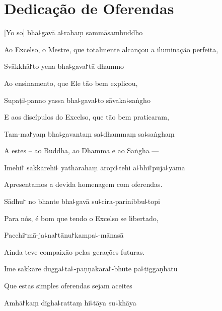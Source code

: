 \chapter{Dedicação de Oferendas}

[Yo so] bha꜕gavā a꜕rahaṃ sammāsambuddho

\begin{english}
Ao Excelso, o Mestre, que totalmente alcançou a iluminação perfeita, 
\end{english}

Svākkhā꜓to yena bha꜕gava꜓tā dhammo

\begin{english}
Ao ensinamento, que Ele tão bem explicou,
\end{english}

Supaṭi꜕panno yassa bha꜕gava꜕to sāvaka꜕saṅgho

\begin{english}
E aos discípulos do Excelso, que tão bem praticaram,
\end{english}

Tam-ma꜓yaṃ bha꜕gavantaṃ sa꜕dhammaṃ sa꜕saṅghaṃ

\begin{english}
A estes – ao Buddha, ao Dhamma e ao Saṅgha ---
\end{english}

Imehi꜓ sakkārehi꜕ yathārahaṃ āropi꜕tehi a꜕bhi꜓pūja꜕yāma

\begin{english}
Apresentamos a devida homenagem com oferendas.
\end{english}

Sādhu꜓ no bhante bha꜕gavā su꜕cira-parinibbu꜕topi

\begin{english}
Para nós, é bom que tendo o Excelso se libertado,
\end{english}

Pacchi꜓mā-ja꜕na꜓tānu꜓kampa꜕-mānasā

\begin{english}
Ainda teve compaixão pelas gerações futuras.
\end{english}

Ime sakkāre dugga꜕ta꜕-paṇṇākāra꜓-bhūte pa꜕ṭiggaṇhātu

\begin{english}
Que estas simples oferendas sejam aceites
\end{english}

Amhā꜓kaṃ dīgha꜕rattaṃ hi꜕tāya su꜕khāya

